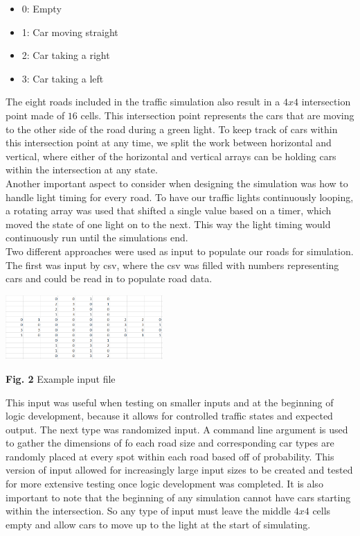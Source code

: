 \documentclass[conference]{IEEEtran}
\begin{document}
\begin{itemize}
	\item 0: Empty
	\item 1: Car moving straight
	\item 2: Car taking a right
	\item 3: Car taking a left \\
\end{itemize}

The eight roads included in the traffic simulation also result in a $4x4$ intersection point made of $16$ cells. This intersection point represents the cars that are moving to the other side of the road during a green light. To keep track of cars within this intersection point at any time, we split the work between horizontal and vertical, where either of the horizontal and vertical arrays can be holding cars within the intersection at any state. \\

Another important aspect to consider when designing the simulation was how to handle light timing for every road. To have our traffic lights continuously looping, a rotating array was used that shifted a single value based on a timer, which moved the state of one light on to the next. This way the light timing would continuously run until the simulations end.\\

\hspace*{.2cm} Two different approaches were used as input to populate our roads for simulation. The first was input by csv, where the csv was filled with numbers representing cars and could be read in to populate road data. 

\includegraphics[width=0.45\textwidth]{input}
\begin{center}
	\textbf{Fig. 2} Example input file  \\
\end{center}

This input was useful when testing on smaller inputs and at the beginning of logic development, because it allows for controlled traffic states and expected output. The next type was randomized input. A command line argument is used to gather the dimensions of fo each road size and corresponding car types are randomly placed at every spot within each road based off of probability. This version of input allowed for increasingly large input sizes to be created and tested for more extensive testing once logic development was completed. It is also important to note that the beginning of any simulation cannot have cars starting within the intersection. So any type of input must leave the middle $4x4$ cells empty and allow cars to move up to the light at the start of simulating. \\
\end{document}
